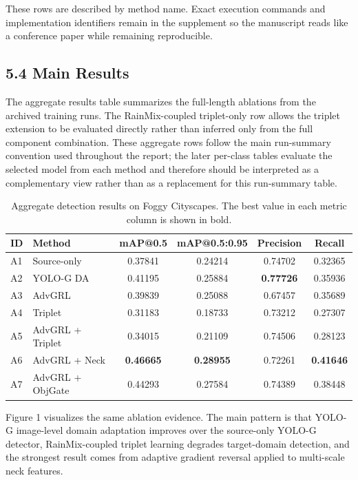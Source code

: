 \documentclass[
  11pt,
]{article}
\begin{document}
These rows are described by method name. Exact execution commands and
implementation identifiers remain in the supplement so the manuscript
reads like a conference paper while remaining reproducible.

\hypertarget{main-results}{%
\subsection{5.4 Main Results}\label{main-results}}

The aggregate results table summarizes the full-length ablations from
the archived training runs. The RainMix-coupled triplet-only row allows
the triplet extension to be evaluated directly rather than inferred only
from the full component combination. These aggregate rows follow the
main run-summary convention used throughout the report; the later
per-class tables evaluate the selected model from each method and
therefore should be interpreted as a complementary view rather than as a
replacement for this run-summary table.

\begin{table}[!t]
\centering
\caption{Aggregate detection results on Foggy Cityscapes. The best value in each metric column is shown in bold.}
\label{tab:aggregate_results}
\small
\setlength{\tabcolsep}{6pt}
\begin{tabular}{llcccc}
\toprule
ID & Method & mAP@0.5 & mAP@0.5:0.95 & Precision & Recall \\
\midrule
A1 & Source-only & 0.37841 & 0.24214 & 0.74702 & 0.32365 \\
A2 & YOLO-G DA & 0.41195 & 0.25884 & \textbf{0.77726} & 0.35936 \\
A3 & AdvGRL & 0.39839 & 0.25088 & 0.67457 & 0.35689 \\
A4 & Triplet & 0.31183 & 0.18733 & 0.73212 & 0.27307 \\
A5 & AdvGRL + Triplet & 0.34015 & 0.21109 & 0.74506 & 0.28123 \\
A6 & AdvGRL + Neck & \textbf{0.46665} & \textbf{0.28955} & 0.72261 & \textbf{0.41646} \\
A7 & AdvGRL + ObjGate & 0.44293 & 0.27584 & 0.74389 & 0.38448 \\
\bottomrule
\end{tabular}
\end{table}

Figure 1 visualizes the same ablation evidence. The main pattern is that
YOLO-G image-level domain adaptation improves over the source-only
YOLO-G detector, RainMix-coupled triplet learning degrades target-domain
detection, and the strongest result comes from adaptive gradient
reversal applied to multi-scale neck features.
\end{document}
